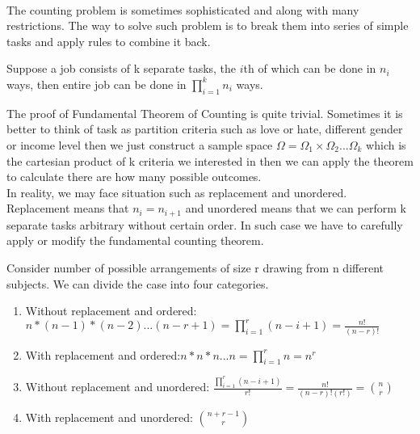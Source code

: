 \documentclass[11pt]{article}
\begin{document}
\paragraph{}
  The counting problem is sometimes sophisticated and along with many restrictions. The way to solve such problem is to break them into series of simple tasks and apply rules to combine it back. 
\begin{theorem}
	Suppose a job consists of k separate tasks, the $i$th of which can be done in $n_i$ ways, then entire job can be done in $\prod_{i=1}^k n_i$ ways.
\end{theorem}
\begin{intuition}
	The proof of Fundamental Theorem of Counting is quite trivial. Sometimes it is better to think of task as partition criteria such as love or hate, different gender or income level then we just construct a sample space $\Omega=\Omega_1\times\Omega_2...\Omega_k$ which is the cartesian product of k criteria we interested in then we can apply the theorem to calculate there are how many possible outcomes.\\
In reality, we may face situation such as replacement and unordered. Replacement means that $n_i=n_{i+1}$ and unordered means that we can perform k separate tasks arbitrary without certain order. In such case we have to carefully apply or modify the fundamental counting theorem. 	
\end{intuition}
Consider number of possible arrangements of size r drawing from n different subjects. We can divide the case into four categories.
\begin{enumerate}
	\item Without replacement and ordered: $n*(n-1)*(n-2)...(n-r+1)=\prod_{i=1}^r(n-i+1)=\frac{n!}{(n-r)!}$
	\item With replacement and ordered:$n*n*n...n=\prod_{i=1}^r n=n^r$
	\item Without replacement and unordered: $\frac{\prod_{i=1}^r(n-i+1)}{r!}=\frac{n!}{(n-r)!(r!)}=\binom{n}{r}$ 
	\item With replacement and unordered: $\binom{n+r-1}{r}$
\end{enumerate}
\end{document}
